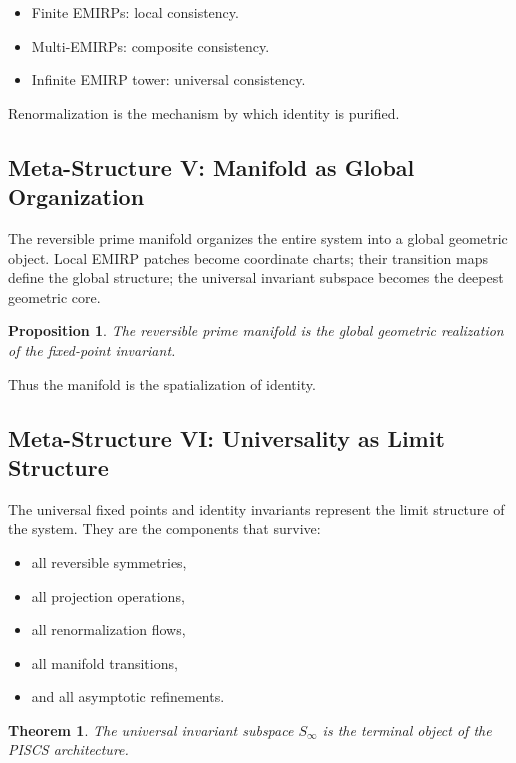 \documentclass[11pt]{article}
\theoremstyle{definition}
\theoremstyle{plain}
\newtheorem{theorem}[definition]{Theorem}
\newtheorem{proposition}[definition]{Proposition}
\theoremstyle{remark}
\begin{document}
\begin{itemize}
    \item Finite EMIRPs: local consistency.
    \item Multi-EMIRPs: composite consistency.
    \item Infinite EMIRP tower: universal consistency.
\end{itemize}

Renormalization is the mechanism by which identity is purified.

\subsection{Meta-Structure V: Manifold as Global Organization}

The reversible prime manifold organizes the entire system into a global
geometric object. Local EMIRP patches become coordinate charts; their
transition maps define the global structure; the universal invariant
subspace becomes the deepest geometric core.

\begin{proposition}
The reversible prime manifold is the global geometric realization of the
fixed-point invariant.
\end{proposition}

Thus the manifold is the spatialization of identity.

\subsection{Meta-Structure VI: Universality as Limit Structure}

The universal fixed points and identity invariants represent the limit
structure of the system. They are the components that survive:

\begin{itemize}
    \item all reversible symmetries,
    \item all projection operations,
    \item all renormalization flows,
    \item all manifold transitions,
    \item and all asymptotic refinements.
\end{itemize}

\begin{theorem}
The universal invariant subspace $S_\infty$ is the terminal object of
the PISCS architecture.
\end{theorem}
\end{document}
